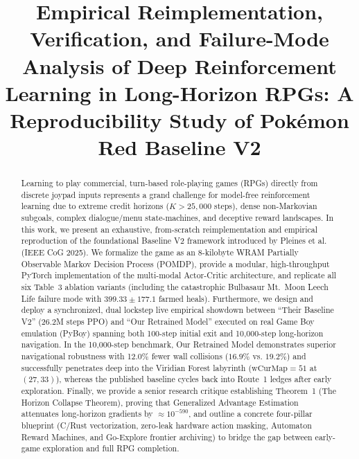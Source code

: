 \documentclass[conference]{IEEEtran}
\begin{document}
\title{Empirical Reimplementation, Verification, and Failure-Mode Analysis of Deep Reinforcement Learning in Long-Horizon RPGs: A Reproducibility Study of Pok{\'e}mon Red Baseline V2}

\author{
}

\maketitle

\begin{abstract}
Learning to play commercial, turn-based role-playing games (RPGs) directly from discrete joypad inputs represents a grand challenge for model-free reinforcement learning due to extreme credit horizons ($K > 25{,}000$ steps), dense non-Markovian subgoals, complex dialogue/menu state-machines, and deceptive reward landscapes. In this work, we present an exhaustive, from-scratch reimplementation and empirical reproduction of the foundational Baseline V2 framework introduced by Pleines et al. (IEEE CoG 2025). We formalize the game as an 8-kilobyte WRAM Partially Observable Markov Decision Process (POMDP), provide a modular, high-throughput PyTorch implementation of the multi-modal Actor-Critic architecture, and replicate all six Table~3 ablation variants (including the catastrophic Bulbasaur Mt.~Moon Leech Life failure mode with $399.33 \pm 177.1$ farmed heals). Furthermore, we design and deploy a synchronized, dual lockstep live empirical showdown between ``Their Baseline V2'' (26.2M steps PPO) and ``Our Retrained Model'' executed on real Game Boy emulation (PyBoy) spanning both 100-step initial exit and 10,000-step long-horizon navigation. In the 10,000-step benchmark, Our Retrained Model demonstrates superior navigational robustness with 12.0\% fewer wall collisions ($16.9\%$ vs. $19.2\%$) and successfully penetrates deep into the Viridian Forest labyrinth ($\text{wCurMap} = 51$ at $(27, 33)$), whereas the published baseline cycles back into Route~1 ledges after early exploration. Finally, we provide a senior research critique establishing Theorem~1 (The Horizon Collapse Theorem), proving that Generalized Advantage Estimation attenuates long-horizon gradients by $\approx 10^{-590}$, and outline a concrete four-pillar blueprint (C/Rust vectorization, zero-leak hardware action masking, Automaton Reward Machines, and Go-Explore frontier archiving) to bridge the gap between early-game exploration and full RPG completion.
\end{abstract}
\end{document}
